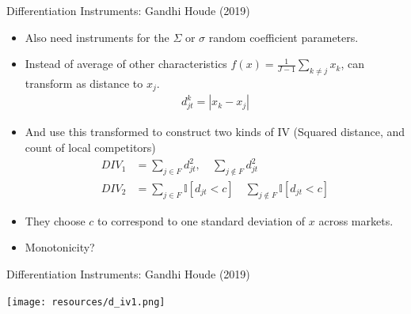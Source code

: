 \documentclass[aspectratio=169,10pt]{beamer}
\begin{document}
\begin{frame}{Differentiation Instruments: Gandhi Houde (2019)}
\begin{itemize}
\item Also need instruments for the $\Sigma$ or $\sigma$ random coefficient parameters.
\item Instead of average of other characteristics $f(x) = \frac{1}{J-1} \sum_{k \neq j} x_k$, can transform as distance to $x_j$.
\begin{align*}
d_{jt} ^k=  |x_k - x_j |
\end{align*}
\item And use this transformed to construct two kinds of IV (Squared distance, and count of local competitors)
\begin{align*}
DIV_1 &= \sum_{j \in F}  d_{jt}^2,  \quad  \sum_{j \notin F}  d_{jt}^2 \\
DIV_2 &= \sum_{j \in F}  \mathbb{I}[d_{jt} < c]   \quad \sum_{j \notin F}   \mathbb{I}[d_{jt} < c]
\end{align*}
\item They choose $c$ to correspond to one standard deviation of $x$ across markets.
\item Monotonicity?
\end{itemize}
\end{frame}


\begin{frame}{Differentiation Instruments: Gandhi Houde (2019)}
\begin{center}
\texttt{[image: resources/d\_iv1.png]}
\end{center}
\end{frame}
\end{document}
